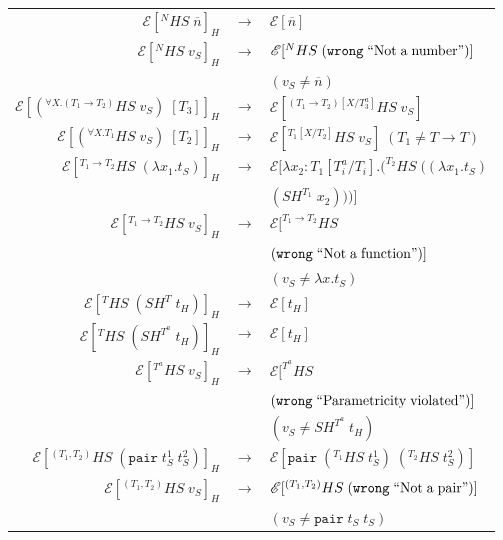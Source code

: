 \begin{figure}
\onehalfspacing
\begin{center}
\begin{tabular}{rcl}
$\mathscr{E}[^{N}HS\;\overline{n}]_{H}$ & $\rightarrow$ & $\mathscr{E}[\overline{n}]$ \\
$\mathscr{E}[^{N}HS\;v_{S}]_{H}$ & $\rightarrow$ & $\mathscr{E}[^{N}HS\;(\mathtt{wrong}\;\mathrm{``Not\;a\;number"})]$ \\
&& $(v_{S}\neq\overline{n})$ \\
$\mathscr{E}[(^{\forall X.(T_{1}\rightarrow T_{2})}HS\;v_{S})\;[T_{3}]]_{H}$ & $\rightarrow$ & $\mathscr{E}[^{(T_{1}\rightarrow T_{2})[X/T^{a}_{3}]}HS\;v_{S}]$ \\
$\mathscr{E}[(^{\forall X.T_{1}}HS\;v_{S})\;[T_{2}]]_{H}$ & $\rightarrow$ & $\mathscr{E}[^{T_{1}[X/T_{2}]}HS\;v_{S}]\;(T_{1}\neq T\rightarrow T)$ \\
$\mathscr{E}[^{T_{1}\rightarrow T_{2}}HS\;(\lambda x_{1}.t_{S})]_{H}$ & $\rightarrow$ & $\mathscr{E}[\lambda x_{2}:T_{1}[T^{a}_{i}/T_{i}].(^{T_{2}}HS\;((\lambda x_{1}.t_{S})$ \\
&& $(SH^{T_{1}}\;x_{2})))]$ \\
$\mathscr{E}[^{T_{1}\rightarrow T_{2}}HS\;v_{S}]_{H}$ & $\rightarrow$ & $\mathscr{E}[^{T_{1}\rightarrow T_{2}}HS$ \\
&& $(\mathtt{wrong}\;\mathrm{``Not\;a\;function"})]$ \\
&& $(v_{S}\neq\lambda x.t_{S})$ \\
$\mathscr{E}[^{T}HS\;(SH^{T}\;t_{H})]_{H}$ & $\rightarrow$ & $\mathscr{E}[t_{H}]$ \\
$\mathscr{E}[^{T}HS\;(SH^{T^{a}}\;t_{H})]_{H}$ & $\rightarrow$ & $\mathscr{E}[t_{H}]$ \\
$\mathscr{E}[^{T^{a}}HS\;v_{S}]_{H}$ & $\rightarrow$ & $\mathscr{E}[^{T^{a}}HS$ \\
&& $(\mathtt{wrong}\;\mathrm{``Parametricity\;violated"})]$ \\
&& $(v_{S}\neq SH^{T^{a}}\;t_{H})$ \\
$\mathscr{E}[^{(T_{1},T_{2})}HS\;(\mathtt{pair}\;t_{S}^{1}\;t_{S}^{2})]_{H}$ & $\rightarrow$ & $\mathscr{E}[\mathtt{pair}\;(^{T_{1}}HS\;t_{S}^{1})\;(^{T_{2}}HS\;t_{S}^{2})]$ \\
$\mathscr{E}[^{(T_{1},T_{2})}HS\;v_{S}]_{H}$ & $\rightarrow$ & $\mathscr{E}[^{(T_{1},T_{2})}HS\;(\mathtt{wrong}\;\mathrm{``Not\;a\;pair"})]$ \\
&& $(v_{S}\neq\mathtt{pair}\;t_{S}\;t_{S})$ \\

\end{tabular}
\end{center}
\end{figure}
